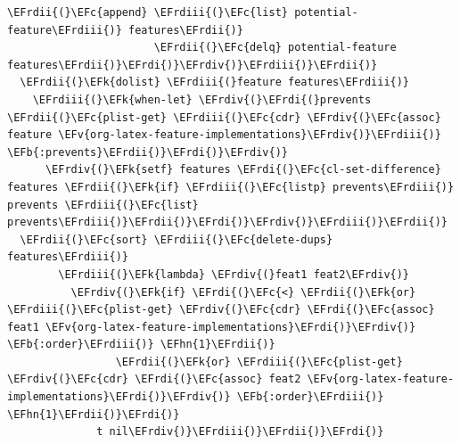 \documentclass{scrartcl}
\newcommand{\EFk}[1]{\textcolor{EFk}{#1}} %
\newcommand{\EFb}[1]{\textcolor{EFb}{#1}} %
\newcommand{\EFc}[1]{\textcolor{EFc}{#1}} %
\newcommand{\EFv}[1]{\textcolor{EFv}{#1}} %
\newcommand{\EFhn}[1]{\textcolor{EFhn}{\textbf{#1}}} %
\newcommand{\EFrdi}[1]{\textcolor{EFrdi}{#1}} %
\newcommand{\EFrdii}[1]{\textcolor{EFrdii}{#1}} %
\newcommand{\EFrdiii}[1]{\textcolor{EFrdiii}{#1}} %
\newcommand{\EFrdiv}[1]{\textcolor{EFrdiv}{#1}} %
\begin{document}
\begin{Code}
\begin{Verbatim}[]
                         \EFrdii{(}\EFc{append} \EFrdiii{(}\EFc{list} potential-feature\EFrdiii{)} features\EFrdii{)}
                       \EFrdii{(}\EFc{delq} potential-feature features\EFrdii{)}\EFrdi{)}\EFrdiv{)}\EFrdiii{)}\EFrdii{)}
  \EFrdii{(}\EFk{dolist} \EFrdiii{(}feature features\EFrdiii{)}
    \EFrdiii{(}\EFk{when-let} \EFrdiv{(}\EFrdi{(}prevents \EFrdii{(}\EFc{plist-get} \EFrdiii{(}\EFc{cdr} \EFrdiv{(}\EFc{assoc} feature \EFv{org-latex-feature-implementations}\EFrdiv{)}\EFrdiii{)} \EFb{:prevents}\EFrdii{)}\EFrdi{)}\EFrdiv{)}
      \EFrdiv{(}\EFk{setf} features \EFrdi{(}\EFc{cl-set-difference} features \EFrdii{(}\EFk{if} \EFrdiii{(}\EFc{listp} prevents\EFrdiii{)} prevents \EFrdiii{(}\EFc{list} prevents\EFrdiii{)}\EFrdii{)}\EFrdi{)}\EFrdiv{)}\EFrdiii{)}\EFrdii{)}
  \EFrdii{(}\EFc{sort} \EFrdiii{(}\EFc{delete-dups} features\EFrdiii{)}
        \EFrdiii{(}\EFk{lambda} \EFrdiv{(}feat1 feat2\EFrdiv{)}
          \EFrdiv{(}\EFk{if} \EFrdi{(}\EFc{<} \EFrdii{(}\EFk{or} \EFrdiii{(}\EFc{plist-get} \EFrdiv{(}\EFc{cdr} \EFrdi{(}\EFc{assoc} feat1 \EFv{org-latex-feature-implementations}\EFrdi{)}\EFrdiv{)} \EFb{:order}\EFrdiii{)} \EFhn{1}\EFrdii{)}
                 \EFrdii{(}\EFk{or} \EFrdiii{(}\EFc{plist-get} \EFrdiv{(}\EFc{cdr} \EFrdi{(}\EFc{assoc} feat2 \EFv{org-latex-feature-implementations}\EFrdi{)}\EFrdiv{)} \EFb{:order}\EFrdiii{)} \EFhn{1}\EFrdii{)}\EFrdi{)}
              t nil\EFrdiv{)}\EFrdiii{)}\EFrdii{)}\EFrdi{)}
\end{Verbatim}
\end{Code}
\end{document}
